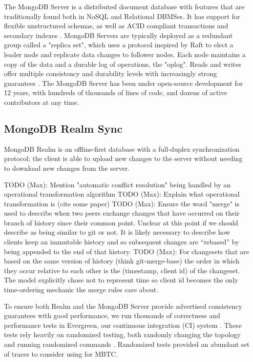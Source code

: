 \documentclass{vldb}
\begin{document}
The MongoDB Server is a distributed document database with features that are traditionally found both in NoSQL and Relational DBMSes.
It has support for flexible unstructured schemas, as well as ACID compliant transactions and secondary indexes \cite{Kamsky19TPCCMongoDB}.
MongoDB Servers are typically deployed as a redundant group called a "replica set", which uses a protocol inspired by Raft \cite{Ongaro14Raft} to elect a leader node and replicate data changes to follower nodes.
Each node maintains a copy of the data and a durable log of operations, the "oplog".
Reads and writes offer multiple consistency and durability levels with increasingly strong guarantees \cite{Schultz19TunableConsistency, Tyulenev19CausalConsistencyMongoDB}.
The MongoDB Server has been under open-source development for 12 years, with hundreds of thousands of lines of code, and dozens of active contributors at any time.

\subsection{MongoDB Realm Sync}
\label{subsec:background_realm}

MongoDB Realm is an offline-first database with a full-duplex synchronization protocol; the client is able to  upload new changes to the server without needing to download new changes from the server.

TODO (Max): Mention "automatic conflict resolution" being handled by an operational transformation algorithm
TODO (Max): Explain what operational transformation is (cite some paper)
TODO (Max): Ensure the word "merge" is used to describe when two peers exchange changes that have occurred on their branch of history since their common point. Unclear at this point if we should describe as being similar to git or not. It is likely necessary to describe how clients keep an immutable history and so subsequent changes are ``rebased'' by being appended to the end of that history.
TODO (Max): For changesets that are based on the same version of history (think git-merge-base) the order in which they occur relative to each other is the (timestamp, client id) of the changeset. The model explicitly chose not to represent time so client id becomes the only time-ordering mechanic the merge rules care about.

To ensure both Realm and the MongoDB Server provide advertised consistency guarantees with good performance, we run thousands of correctness and performance tests in Evergreen, our continuous integration (CI) system \cite{Daly19iChangePointMongoDB}.
These tests rely heavily on randomized testing, both randomly changing the topology and running randomized commands \cite{Guo17MongoDBFuzzTester}.
Randomized tests provided an abundant set of traces to consider using for MBTC.
\end{document}
